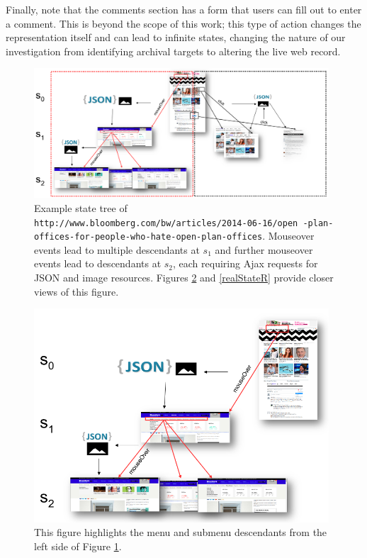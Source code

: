 \documentclass{sig-alternate}
\begin{document}
Finally, note that the comments section has a form that users can fill out to enter a comment. This is beyond the scope of this work; this type of action changes the representation itself and can lead to infinite states, changing the nature of our investigation from identifying archival targets to altering the live web record.



\begin{figure}[hp]
\centering
\includegraphics[width=0.98\textwidth]{./imgs/realStates4.png}
\caption{Example state tree of \texttt{http://www.bloomberg.com/bw/articles/2014-06-16/open -plan-offices-for-people-who-hate-open-plan-offices}. Mouseover events lead to multiple descendants at $s_1$ and further mouseover events lead to descendants at $s_2$, each requiring Ajax requests for JSON and image resources. Figures \ref{realStateL} and \ref{realStateR} provide closer views of this figure.}
\label{realState}
\end{figure}


\begin{figure}[hp]
\centering
\includegraphics[width=0.98\textwidth]{./imgs/realStates_left.png}
\caption{This figure highlights the menu and submenu descendants from the left side of Figure \ref{realState}.}
\label{realStateL}
\end{figure}
\end{document}

